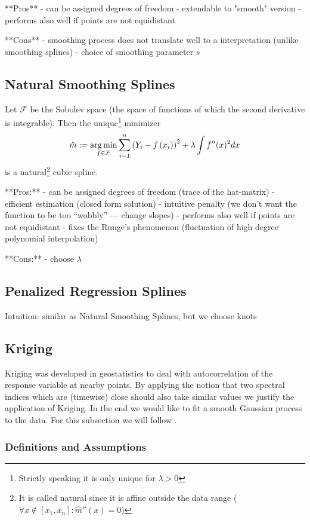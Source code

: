 **Pros**
- can be assigned degrees of freedom
- extendable to "smooth" version
- performs also well if points are not equidistant

**Cons**
- smoothing process does not translate well to a interpretation (unlike smoothing splines)
- choice of smoothing parameter $s$

\subsection{Natural Smoothing Splines}
\label{sec:Natural}
Let $\mathcal F$ be the Sobolev space (the space of functions of which the second derivative is integrable). Then the unique\footnote{Strictly speaking it is only unique for $\lambda > 0$} minimizer
$$\hat m :=\operatorname*{arg\, min}_{f \in \mathcal F} \sum_{i=1}^{n}\left(Y_{i}-{f}\left(x_{i}\right)\right)^{2}+\lambda \int {f}^{\prime \prime}(x)^{2} d x$$
is a natural\footnote{It is called natural since it is affine outside the data range ($\forall x\notin [x_1, x_n]:\hat m''(x) = 0$)} cubic spline.

**Pros:**
- can be assigned degrees of freedom (trace of the hat-matrix)
- efficient estimation (closed form solution)
- intuitive penalty (we don't want the function to be too ``wobbly'' --- change slopes)
- performs also well if points are not equidistant
- fixes the Runge's phenomenon (fluctuation of high degree polynomial interpolation)

**Cons:**
- choose $\lambda$

\subsection{Penalized Regression Splines}
\label{sec:Penalized}
Intuition: similar as Natural Smoothing Splines, but we choose knots

\subsection{Kriging}
\label{sec:Kriging}

Kriging was developed in geostatistics to deal with autocorrelation of the response variable at nearby points. By applying the notion that two spectral indices which are (timewise) close should also take similar values we justify the application of Kriging. In the end we would like to fit a smooth Gaussian process to the data. For this subsection we will follow \cite{diggleGaussianModelsGeostatistical2007}.

\subsubsection*{Definitions and Assumptions}

